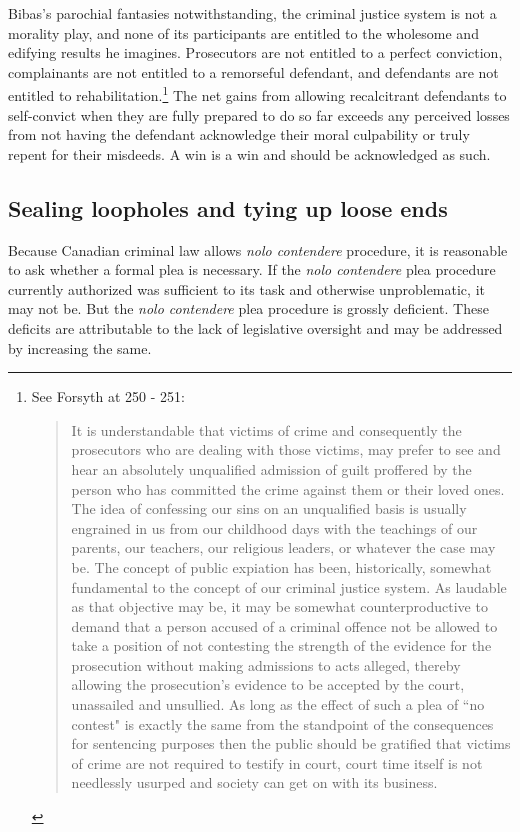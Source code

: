 Bibas's parochial fantasies notwithstanding, the criminal justice system is not a morality play, and none of its participants are entitled to the wholesome and edifying results he imagines. Prosecutors are not entitled to a perfect conviction, complainants are not entitled to a remorseful defendant, and defendants are not entitled to rehabilitation.\footnote{See Forsyth at 250 - 251: \begin{quote}
    It is understandable that victims of crime and consequently the prosecutors who are dealing with those victims, may prefer to see and hear an absolutely unqualified admission of guilt proffered by the person who has committed the crime against them or their loved ones. The idea of confessing our sins on an unqualified basis is usually engrained in us from our childhood days with the teachings of our parents, our teachers, our religious leaders, or whatever the case may be. The concept of public expiation has been, historically, somewhat fundamental to the concept of our criminal justice system. As laudable as that objective may be, it may be somewhat counterproductive to demand that a person accused of a criminal offence not be allowed to take a position of not contesting the strength of the evidence for the prosecution without making admissions to acts alleged, thereby allowing the prosecution's evidence to be accepted by the court, unassailed and unsullied. As long as the effect of such a plea of ``no contest" is exactly the same from the standpoint of the consequences for sentencing purposes then the public should be gratified that victims of crime are not required to testify in court, court time itself is not needlessly usurped and society can get on with its business.
\end{quote}} The net gains from allowing recalcitrant defendants to self-convict when they are fully prepared to do so far exceeds any perceived losses from not having the defendant acknowledge their moral culpability or truly repent for their misdeeds. A win is a win and should be acknowledged as such.

\subsection{Sealing loopholes and tying up loose ends}

Because Canadian criminal law allows \textit{nolo contendere} procedure, it is reasonable to ask whether a formal plea is necessary. If the \textit{nolo contendere} plea procedure currently authorized was sufficient to its task and otherwise unproblematic, it may not be. But the \textit{nolo contendere} plea procedure is grossly deficient. These deficits are attributable to the lack of legislative oversight and may be addressed by increasing the same.

